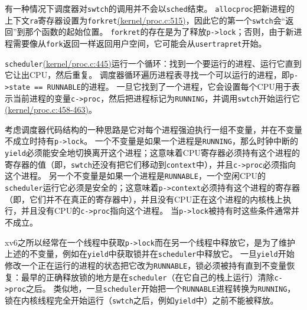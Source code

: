 有一种情况下调度器对\texttt{swtch}的调用并不会以\texttt{sched}结束。
\texttt{allocproc}把新进程的上下文\texttt{ra}寄存器设置为\texttt{forkret}\href{https://github.com/mit-pdos/xv6-riscv/blob/risc/kernel/proc.c#L515}{(kernel/proc.c:515)}，因此它的第一个\texttt{swtch}会“返回”到那个函数的起始位置。
\texttt{forkret}的存在是为了释放\texttt{p->lock}；否则，由于新进程需要像从\texttt{fork}返回一样返回用户空间，它可能会从\texttt{usertrapret}开始。

\texttt{scheduler}\href{https://github.com/mit-pdos/xv6-riscv/blob/risc/kernel/proc.c#L445}{(kernel/proc.c:445)}运行一个循环：找到一个要运行的进程、运行它直到它让出CPU，然后重复。
调度器循环遍历进程表寻找一个可以运行的进程，即\texttt{p->state == RUNNABLE}的进程。
一旦它找到了一个进程，它会设置每个CPU用于表示当前进程的变量\texttt{c->proc}，然后把进程标记为\texttt{RUNNING}，并调用\texttt{swtch}开始运行它\href{https://github.com/mit-pdos/xv6-riscv/blob/risc/kernel/proc.c#L458-L463}{(kernel/proc.c:458-463)}。

考虑调度器代码结构的一种思路是它对每个进程强迫执行一组不变量，并在不变量不成立时持有\texttt{p->lock}。
一个不变量是如果一个进程是\texttt{RUNNING}，那么时钟中断的\texttt{yield}必须能安全地切换离开这个进程；这意味着CPU寄存器必须持有这个进程的寄存器的值（即，\texttt{swtch}还没有把它们移动到\texttt{context}中），并且\texttt{c->proc}必须指向这个进程。
另一个不变量是如果一个进程是\texttt{RUNNABLE}，一个空闲CPU的\texttt{scheduler}运行它必须是安全的；这意味着\texttt{p->context}必须持有这个进程的寄存器（即，它们并不在真正的寄存器中），并且没有CPU正在这个进程的内核栈上执行，并且没有CPU的\texttt{c->proc}指向这个进程。
当\texttt{p->lock}被持有时这些条件通常并不成立。

xv6之所以经常在一个线程中获取\texttt{p->lock}而在另一个线程中释放它，是为了维护上述的不变量，例如在\texttt{yield}中获取锁并在\texttt{scheduler}中释放它。
一旦\texttt{yield}开始修改一个正在运行的进程的状态把它改为\texttt{RUNNABLE}，锁必须被持有直到不变量恢复：最早的正确释放锁的地方是在\texttt{scheduler}（在它自己的栈上运行）清除\texttt{c->proc}之后。
类似地，一旦\texttt{scheduler}开始把一个\texttt{RUNNABLE}进程转换为\texttt{RUNNING}，锁在内核线程完全开始运行（\texttt{swtch}之后，例如\texttt{yield}中）之前不能被释放。
